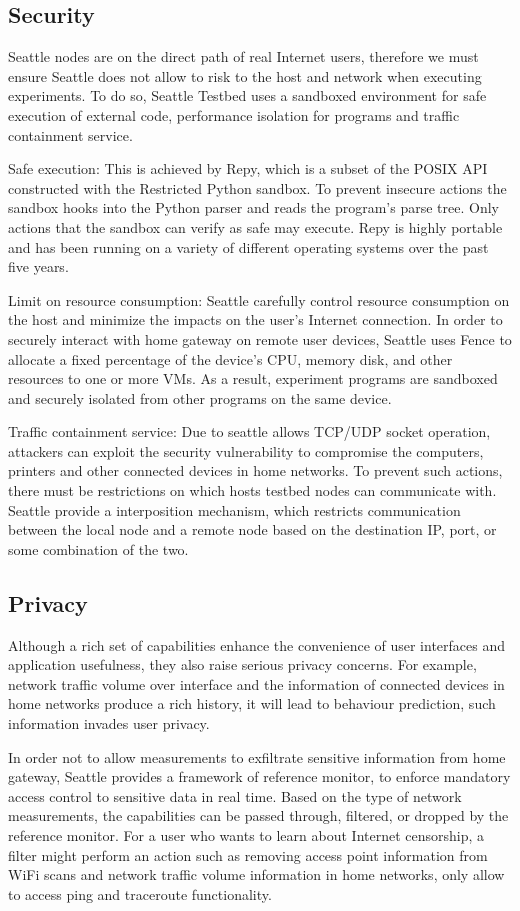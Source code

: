 \subsection{Security}
Seattle nodes are on the direct path of real Internet users, therefore we 
must ensure Seattle does not allow to risk to the host and network when 
executing experiments. To do so, Seattle Testbed uses a sandboxed 
environment for safe execution of external code, performance isolation for 
programs and traffic containment service. 

Safe execution: This is achieved by Repy, which is a subset of the POSIX API 
constructed with the Restricted Python sandbox. To prevent insecure actions 
the sandbox hooks into the Python parser and reads the program's parse tree. 
Only actions that the sandbox can verify as safe may execute. Repy is highly 
portable and has been running on a variety of different operating systems 
over the past five years.

Limit on resource consumption: Seattle carefully control resource 
consumption on the host and minimize the impacts on the user's Internet 
connection. In order to securely interact with home gateway on remote user 
devices, Seattle uses Fence to allocate a fixed percentage of the device's 
CPU, memory disk, and other resources to one or more VMs. As a result, 
experiment programs are sandboxed and securely isolated from other programs 
on the same device. 

Traffic containment service: Due to seattle allows TCP/UDP socket operation, 
attackers can exploit the security vulnerability to compromise the 
computers, printers and other connected devices in home networks. To prevent 
such actions, there must be restrictions on which hosts testbed nodes can 
communicate with. Seattle provide a interposition mechanism, which restricts 
communication between the local node and a remote node based on the 
destination IP, port, or some combination of the two. 

\subsection{Privacy}
Although a rich set of capabilities enhance the convenience of user 
interfaces and application usefulness, they also raise serious privacy 
concerns. For example, network traffic volume over interface and the 
information of connected devices in home networks produce a rich history, it 
will lead to behaviour prediction, such information invades user privacy. 

In order not to allow measurements to exfiltrate sensitive information from 
home gateway, Seattle provides a framework of reference monitor, to enforce 
mandatory access control to sensitive data in real time. Based on the type 
of network measurements, the capabilities can be passed through, filtered, 
or dropped by the reference monitor. For a user who wants to learn about 
Internet censorship, a filter might perform an action such as removing 
access point information from WiFi scans and network traffic volume 
information in home networks, only allow to access ping and traceroute 
functionality.